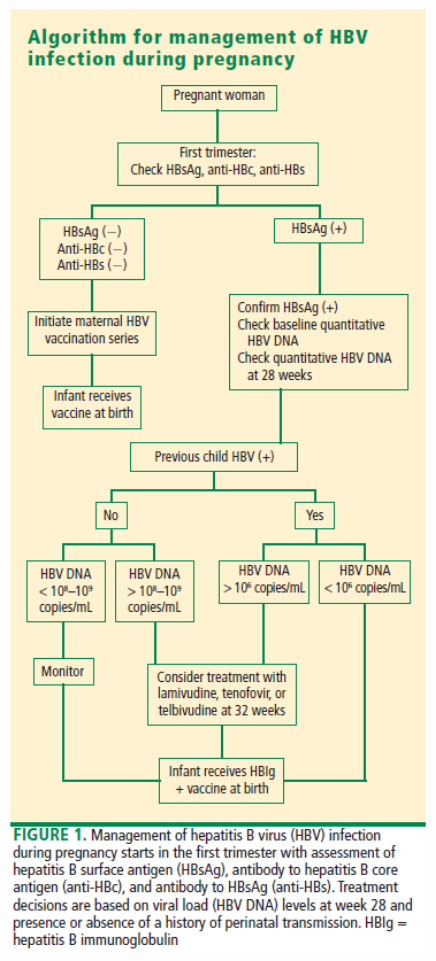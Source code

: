 \documentclass[10pt,a4paper]{article}
\begin{document}
	\begin{figure}[p]
		\centering
		\includegraphics[width=13cm,height=25cm]{pic}
	\end{figure}
	
	
\end{document}
